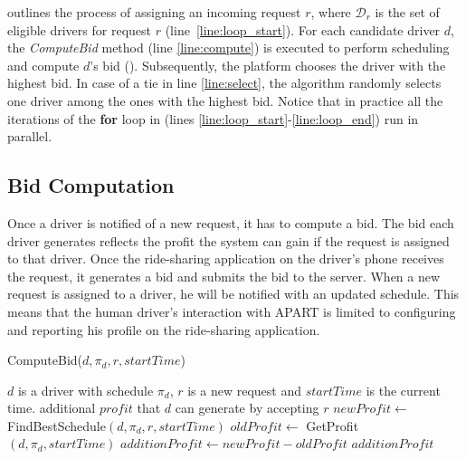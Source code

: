  outlines the process of assigning an incoming request $r$, where $\mathcal{D}_r$ is the set of eligible drivers for request $r$ (line~\ref{line:loop_start}). For each candidate driver $d$, the \emph{ComputeBid} method (line \ref{line:compute}) is executed to perform scheduling and compute $d$'s bid (). Subsequently, the platform chooses the driver with the highest bid. In case of a tie in line \ref{line:select}, the algorithm randomly selects one driver among the ones with the highest bid. Notice that in practice all the iterations of the \textbf{for} loop in  (lines \ref{line:loop_start}-\ref{line:loop_end}) run in parallel.

\subsection{Bid Computation}
\label{subsec:bidcomp}

Once a driver is notified of a new request, it has to compute a bid. The bid each driver generates reflects the profit the system can gain if the request is assigned to that driver. Once the ride-sharing application on the driver's phone receives the request, it generates a bid and submits the bid to the server. When a new request is assigned to a driver, he will be notified with an updated schedule. This means that the human driver's interaction with APART is limited to configuring and reporting his profile on the ride-sharing application.

\begin{algorithm}[!h]
	\caption{ComputeBid($d, \pi_d, r, startTime$)}
	\label{algo:comp_bid}
	\begin{algorithmic}[1]
		\REQUIRE $d$ is a driver with schedule $\pi_d$, $r$ is a new request and $startTime$ is the current time.
		\ENSURE additional $profit$ that $d$ can generate by accepting $r$
		\STATE $newProfit \leftarrow $FindBestSchedule$(d, \pi_d, r, startTime)$\label{ln:fbs}
        \STATE $oldProfit\leftarrow $ GetProfit$(d, \pi_d, startTime)$ \label{ln:gps}
		\STATE $additionProfit \leftarrow newProfit - oldProfit$
		\RETURN $additionProfit$
	\end{algorithmic}
\end{algorithm}

